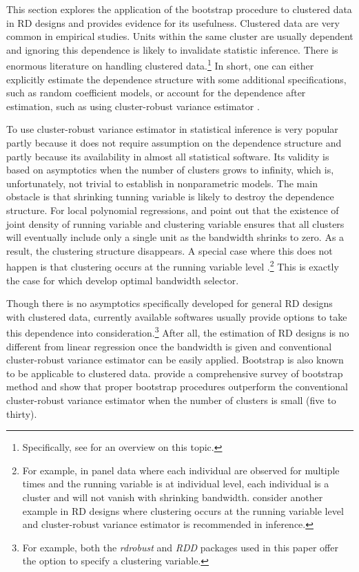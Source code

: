 \documentclass[12pt,]{article}
\DeclareMathOperator{\1}{\mathbbm{1}}
\begin{document}
This section explores the application of the bootstrap procedure to clustered data in RD designs and provides evidence for its usefulness. Clustered data are very common in empirical studies. Units within the same cluster are usually dependent and ignoring this dependence is likely to invalidate statistic inference. There is enormous literature on handling clustered data.\footnote{Specifically, see \cite{wooldridge2003cluster,cameron2012robust,cameron2015practitioner} for an overview on this topic.} In short, one can either explicitly estimate the dependence structure with some additional specifications, such as random coefficient models, or account for the dependence after estimation, such as using cluster-robust variance estimator \citep{liang1986longitudinal,arellano1987practitioners}.

To use cluster-robust variance estimator in statistical inference is very popular partly because it does not require assumption on the dependence structure and partly because its availability in almost all statistical software. Its validity is based on asymptotics when the number of clusters grows to infinity, which is, unfortunately, not trivial to establish in nonparametric models. The main obstacle is that shrinking tunning variable is likely to destroy the dependence structure. For local polynomial regressions, \cite{wang2003marginal} and \cite{chen2008design} point out that the existence of joint density of running variable and clustering variable ensures that all clusters will eventually include only a single unit as the bandwidth shrinks to zero. As a result, the clustering structure disappears. A special case where this does not happen is that clustering occurs at the running variable level \citep{chen2005local}.\footnote{For example, in panel data where each individual are observed for multiple times and the running variable is at individual level, each individual is a cluster and will not vanish with shrinking bandwidth. \cite{lee2008regression} consider another example in RD designs where clustering occurs at the running variable level and cluster-robust variance estimator is recommended in inference.} This is exactly the case for which \cite{bartalotti2016regression} develop optimal bandwidth selector.

Though there is no asymptotics specifically developed for general RD designs with clustered data, currently available softwares usually provide options to take this dependence into consideration.\footnote{For example, both the \textit{rdrobust} and \textit{RDD} packages used in this paper offer the option to specify a clustering variable.} After all, the estimation of RD designs is no different from linear regression once the bandwidth is given and conventional cluster-robust variance estimator can be easily applied. Bootstrap is also known to be applicable to clustered data. \cite{cameron2008bootstrap} provide a comprehensive survey of bootstrap method and show that proper bootstrap procedures outperform the conventional cluster-robust variance estimator when the number of clusters is small (five to thirty).
\end{document}
